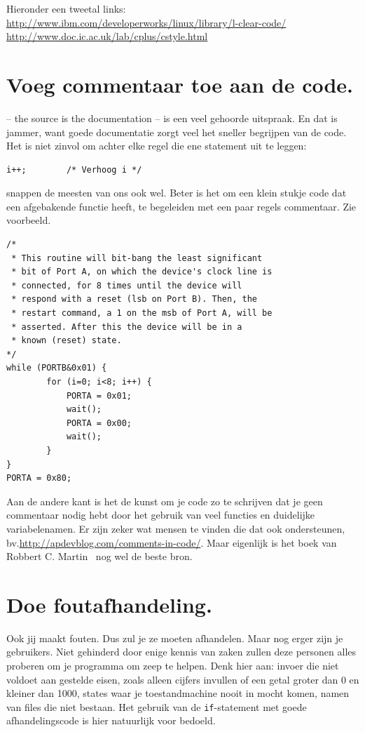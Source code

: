 \documentclass[12pt,a4paper,final,twoside,fleqn]{article}
\def\lstC{\lstinline[style=C]}
\begin{document}
Hieronder een tweetal links: \\
\url{http://www.ibm.com/developerworks/linux/library/l-clear-code/} \\
\url{http://www.doc.ic.ac.uk/lab/cplus/cstyle.html}


\section{Voeg commentaar toe aan de code.}
-- the source is the documentation -- is een veel gehoorde uitspraak. En dat is jammer,
want goede documentatie zorgt veel het sneller begrijpen van de code. Het is niet zinvol
om achter elke regel die ene statement uit te leggen:

\begin{lstlisting}[style=C,numbers=none,belowcaptionskip=-12pt]
i++;		/* Verhoog i */
\end{lstlisting}

snappen de meesten van ons ook wel. Beter is het om een klein stukje code dat een
afgebakende functie heeft, te begeleiden met een paar regels commentaar. Zie voorbeeld.

\begin{lstlisting}[style=C,caption=Code met commentaar]
/*
 * This routine will bit-bang the least significant
 * bit of Port A, on which the device's clock line is
 * connected, for 8 times until the device will
 * respond with a reset (lsb on Port B). Then, the
 * restart command, a 1 on the msb of Port A, will be
 * asserted. After this the device will be in a
 * known (reset) state.
*/
while (PORTB&0x01) {
		for (i=0; i<8; i++) {
			PORTA = 0x01;
			wait();
			PORTA = 0x00;
			wait();
		}
}
PORTA = 0x80;
\end{lstlisting}

Aan de andere kant is het de kunst om je code zo te schrijven dat je geen commentaar nodig
hebt door het gebruik van veel functies en duidelijke variabelenamen. Er zijn zeker wat mensen te
vinden die dat ook ondersteunen, bv.\@ \url{http://apdevblog.com/comments-in-code/}.
Maar eigenlijk is het boek van Robbert C. Martin~\cite{martin2009clean} nog wel de beste bron.

\section{Doe foutafhandeling.}
Ook jij maakt fouten. Dus zul je ze moeten afhandelen. Maar nog erger zijn je
gebruikers. Niet gehinderd door enige kennis van zaken zullen deze personen
alles proberen om je programma om zeep te helpen. Denk hier aan: invoer die niet
voldoet aan gestelde eisen, zoals alleen cijfers invullen of een getal groter dan
0 en kleiner dan 1000, states waar je toestandmachine nooit in mocht komen, namen
van files die niet bestaan. Het gebruik van de \lstC{if}-statement met goede
afhandelingscode is hier natuurlijk voor bedoeld.
\end{document}

